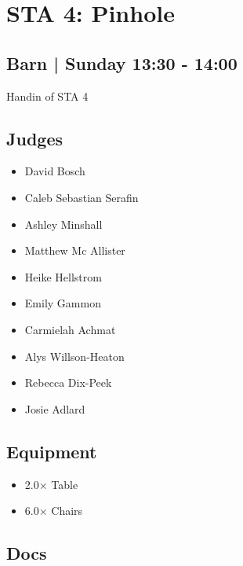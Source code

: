 \documentclass[10pt]{article}
\begin{document}
		\begin{minipage}{\linewidth}
		\setcounter{section}{47}
	\section{STA 4: Pinhole }
	\subsection*{Barn | Sunday 13:30 - 14:00}

	Handin of STA 4

	\begin{multicols}{2}
	\subsection*{\faUsers \: Judges}
	\begin{itemize}
			\item David Bosch
			\item Caleb Sebastian Serafin
			\item Ashley Minshall
			\item Matthew Mc Allister
			\item Heike Hellstrom
			\item Emily Gammon
			\item Carmielah Achmat
			\item Alys Willson-Heaton
			\item Rebecca Dix-Peek
			\item Josie Adlard
		\end{itemize}
	\columnbreak
	\subsection*{\faWrench \: Equipment}
	
        \begin{itemize}
                    \item 2.0$\times$ \: Table
                    \item 6.0$\times$ \: Chairs
                \end{itemize}
                \vfill\null
        \subsection*{\faFile \: Docs}
     	\end{multicols}


	\vspace{1cm}
	\end{minipage}
\end{document}
